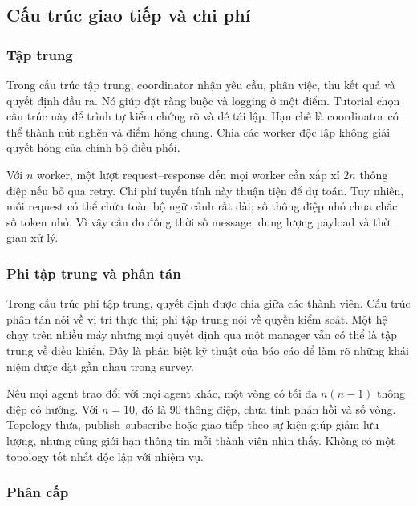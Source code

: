 \subsection{Cấu trúc giao tiếp và chi
phí}\label{cux1ea5u-truxfac-giao-tiux1ebfp-vuxe0-chi-phuxed}

\subsubsection{Tập trung}\label{tux1eadp-trung}

Trong cấu trúc tập trung, coordinator nhận yêu cầu, phân việc, thu kết
quả và quyết định đầu ra. Nó giúp đặt ràng buộc và logging ở một điểm.
Tutorial chọn cấu trúc này để trình tự kiểm chứng rõ và dễ tái lập. Hạn
chế là coordinator có thể thành nút nghẽn và điểm hỏng chung. Chia các
worker độc lập không giải quyết hỏng của chính bộ điều phối.

Với \(n\) worker, một lượt request--response đến mọi worker cần xấp xỉ
\(2n\) thông điệp nếu bỏ qua retry. Chi phí tuyến tính này thuận tiện để
dự toán. Tuy nhiên, mỗi request có thể chứa toàn bộ ngữ cảnh rất dài; số
thông điệp nhỏ chưa chắc số token nhỏ. Vì vậy cần đo đồng thời số
message, dung lượng payload và thời gian xử lý.

\subsubsection{Phi tập trung và phân
tán}\label{phi-tux1eadp-trung-vuxe0-phuxe2n-tuxe1n}

Trong cấu trúc phi tập trung, quyết định được chia giữa các thành viên.
Cấu trúc phân tán nói về vị trí thực thi; phi tập trung nói về quyền
kiểm soát. Một hệ chạy trên nhiều máy nhưng mọi quyết định qua một
manager vẫn có thể là tập trung về điều khiển. Đây là phân biệt kỹ thuật
của báo cáo để làm rõ những khái niệm được đặt gần nhau trong survey.

Nếu mọi agent trao đổi với mọi agent khác, một vòng có tối đa \(n(n-1)\)
thông điệp có hướng. Với \(n=10\), đó là 90 thông điệp, chưa tính phản
hồi và số vòng. Topology thưa, publish--subscribe hoặc giao tiếp theo sự
kiện giúp giảm lưu lượng, nhưng cũng giới hạn thông tin mỗi thành viên
nhìn thấy. Không có một topology tốt nhất độc lập với nhiệm vụ.

\subsubsection{Phân cấp}\label{phuxe2n-cux1ea5p}

